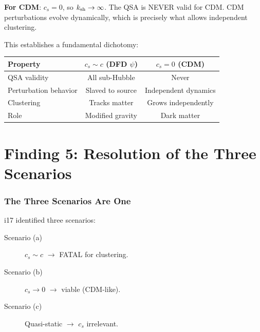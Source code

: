 \documentclass[11pt]{article}
\begin{document}
\textbf{For CDM}: $c_s = 0$, so $k_{\rm sh} \to \infty$. The QSA
is NEVER valid for CDM. CDM perturbations evolve dynamically,
which is precisely what allows independent clustering.

This establishes a fundamental dichotomy:
\begin{center}
\begin{tabular}{lcc}
\toprule
Property & $c_s \sim c$ (DFD $\psi$) & $c_s = 0$ (CDM) \\
\midrule
QSA validity & All sub-Hubble & Never \\
Perturbation behavior & Slaved to source & Independent dynamics \\
Clustering & Tracks matter & Grows independently \\
Role & Modified gravity & Dark matter \\
\bottomrule
\end{tabular}
\end{center}


\part{Finding 5: Resolution of the Three Scenarios}
\label{part:resolution}

\section{The Three Scenarios Are One}

i17 identified three scenarios:
\begin{description}
\item[Scenario (a)] $c_s \sim c$ $\to$ FATAL for clustering.
\item[Scenario (b)] $c_s \to 0$ $\to$ viable (CDM-like).
\item[Scenario (c)] Quasi-static $\to$ $c_s$ irrelevant.
\end{description}
\end{document}
